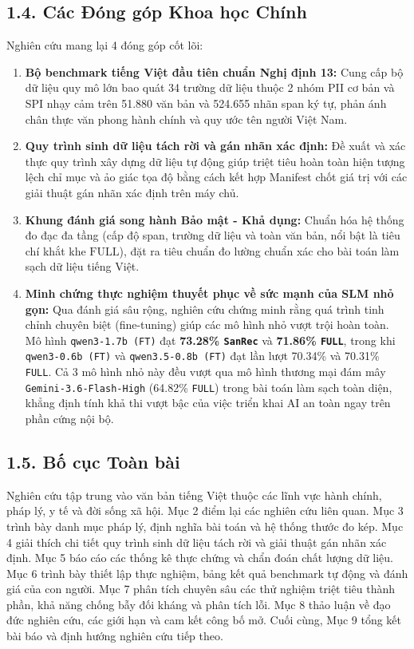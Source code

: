 \documentclass[
  11pt,
  a4paper,
]{article}
\providecommand{\tightlist}{%
  \setlength{\itemsep}{0pt}\setlength{\parskip}{0pt}}
\begin{document}
\subsection{1.4. Các Đóng góp Khoa học
Chính}\label{cuxe1c-ux111uxf3ng-guxf3p-khoa-hux1ecdc-chuxednh}

Nghiên cứu mang lại 4 đóng góp cốt lõi:

\begin{enumerate}
\def\labelenumi{\arabic{enumi}.}
\tightlist
\item
  \textbf{Bộ benchmark tiếng Việt đầu tiên chuẩn Nghị định 13:} Cung cấp bộ dữ liệu quy mô lớn bao
  quát 34 trường dữ liệu thuộc 2 nhóm PII cơ bản và SPI nhạy cảm trên 51.880 văn bản và 524.655 nhãn
  span ký tự, phản ánh chân thực văn phong hành chính và quy ước tên người Việt Nam.
\item
  \textbf{Quy trình sinh dữ liệu tách rời và gán nhãn xác định:} Đề xuất và xác thực quy trình xây
  dựng dữ liệu tự động giúp triệt tiêu hoàn toàn hiện tượng lệch chỉ mục và ảo giác tọa độ bằng cách
  kết hợp Manifest chốt giá trị với các giải thuật gán nhãn xác định trên máy chủ.
\item
  \textbf{Khung đánh giá song hành Bảo mật - Khả dụng:} Chuẩn hóa hệ thống đo đạc đa tầng (cấp độ
  span, trường dữ liệu và toàn văn bản, nổi bật là tiêu chí khắt khe \(\text{FULL}\)), đặt ra tiêu
  chuẩn đo lường chuẩn xác cho bài toán làm sạch dữ liệu tiếng Việt.
\item
  \textbf{Minh chứng thực nghiệm thuyết phục về sức mạnh của SLM nhỏ gọn:} Qua đánh giá sâu rộng,
  nghiên cứu chứng minh rằng quá trình tinh chỉnh chuyên biệt (fine-tuning) giúp các mô hình nhỏ
  vượt trội hoàn toàn. Mô hình \texttt{qwen3-1.7b\ (FT)} đạt \textbf{73.28\% \texttt{SanRec}} và
  \textbf{71.86\% \texttt{FULL}}, trong khi \texttt{qwen3-0.6b\ (FT)} và \texttt{qwen3.5-0.8b\ (FT)}
  đạt lần lượt 70.34\% và 70.31\% \texttt{FULL}. Cả 3 mô hình nhỏ này đều vượt qua mô hình thương
  mại đám mây \texttt{Gemini-3.6-Flash-High} (64.82\% \texttt{FULL}) trong bài toán làm sạch toàn
  diện, khẳng định tính khả thi vượt bậc của việc triển khai AI an toàn ngay trên phần cứng nội bộ.
\end{enumerate}

\subsection{1.5. Bố cục Toàn bài}\label{bux1ed1-cux1ee5c-touxe0n-buxe0i}

Nghiên cứu tập trung vào văn bản tiếng Việt thuộc các lĩnh vực hành chính, pháp lý, y tế và đời sống
xã hội. Mục 2 điểm lại các nghiên cứu liên quan. Mục 3 trình bày danh mục pháp lý, định nghĩa bài
toán và hệ thống thước đo kép. Mục 4 giải thích chi tiết quy trình sinh dữ liệu tách rời và giải
thuật gán nhãn xác định. Mục 5 báo cáo các thống kê thực chứng và chẩn đoán chất lượng dữ liệu. Mục
6 trình bày thiết lập thực nghiệm, bảng kết quả benchmark tự động và đánh giá của con người. Mục 7
phân tích chuyên sâu các thử nghiệm triệt tiêu thành phần, khả năng chống bẫy đối kháng và phân tích
lỗi. Mục 8 thảo luận về đạo đức nghiên cứu, các giới hạn và cam kết công bố mở. Cuối cùng, Mục 9
tổng kết bài báo và định hướng nghiên cứu tiếp theo.
\end{document}
